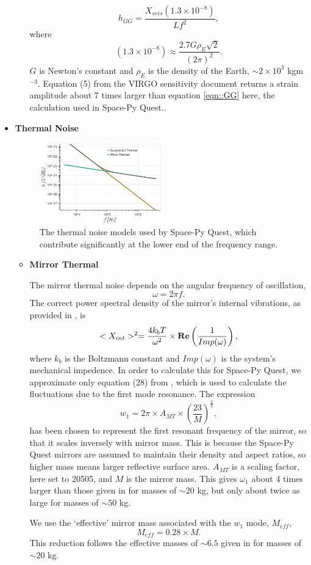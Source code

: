 \documentclass{article}
\begin{document}
\begin{itemize}
\begin{itemize}
    \begin{equation}
    \label{eqn::GG}
    h_{GG} = \frac{X_{seis}(1.3\times10^{-8})}{Lf^2},
    \end{equation}
    where
    \[
    (1.3\times10^{-8}) \approx \frac{2.7G\rho_E\sqrt{2}}{(2\pi)^2}.
    \]
   $G$ is Newton's constant and $\rho_E$ is the density of the Earth, $\sim 2 \times 10^3$ kgm$^{-3}$. Equation (5) from the VIRGO sensitivity document returns a strain amplitude about 7 times larger than equation \ref{eqn::GG} here, the calculation used in Space-Py Quest..
   \end{itemize}
   \item \textbf{Thermal Noise} \par
    \begin{figure}[h!]
    \centering
    \includegraphics[width=0.5\textwidth]{SPQ_aLIGO_thermal.png}
    \caption{The thermal noise models used by Space-Py Quest, which contribute significantly at the lower end of the frequency range.}
    \label{fig:thermal}
    \end{figure}
    \begin{itemize}
    \item \textbf{Mirror Thermal} \par
    The mirror thermal noise depends on the angular frequency of oscillation,
    \[
    \omega = 2\pi f.
    \]
     The correct power spectral density of the mirror's internal vibrations, as provided in \cite{VIRGO}, is
    \[
    <X_{int}>^2 = \frac{4k_bT}{\omega^2} \times\text{\textbf{Re}}\left(\frac{1}{Imp(\omega)}\right),
    \]
    where $k_b$ is the Boltzmann constant and $Imp(\omega)$ is the system's mechanical impedence. In order to calculate this for Space-Py Quest, we  approximate only equation (28) from \cite{VIRGO}, which is used to calculate the fluctuations due to the first mode resonance. The expression
    \[
    w_1 = 2\pi \times A_{MT} \times \left(\frac{23}{M}\right)^{\frac{2}{3}}, 
    \]
    has been chosen to represent the first resonant frequency of the mirror, so that it scales inversely with mirror mass. This is because the Space-Py Quest mirrors are assumed to maintain their density and aspect ratios, so higher mass means larger reflective surface area. $A_{MT}$ is a scaling factor, here set to 20505, and $M$ is the mirror mass. This gives $\omega_1$ about 4 times larger than those given in \cite{VIRGO} for masses of $\sim 20$ kg, but only about twice as large for masses of $\sim 50$ kg. 
    \par
    We use the `effective' mirror mass associated with the $w_1$ mode, $M_{eff}$,
    \[
    M_{eff} = 0.28\times M.
    \]
    This reduction follows the effective masses of $\sim 6.5$ given in \cite{VIRGO} for masses of $\sim 20$ kg.
    

\end{itemize}
\end{itemize}
\end{document}

